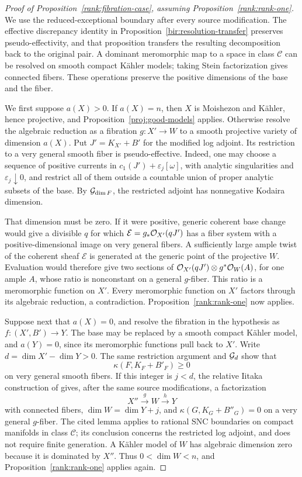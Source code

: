 \begin{proof}[Proof of Proposition~\ref{rank:fibration-case},
assuming Proposition~\ref{rank:rank-one}]
We use the reduced-exceptional boundary after every source modification.
The effective discrepancy identity in
Proposition~\ref{bir:resolution-transfer} preserves pseudo-effectivity,
and that proposition transfers the resulting decomposition back to the
original pair.  A dominant meromorphic map to
a space in class \(\mathcal C\) can be resolved on smooth compact Kähler
models; taking Stein factorization gives connected fibers.  These
operations preserve the positive dimensions of the base and the fiber.

We first suppose \(a(X)>0\).  If \(a(X)=n\), then \(X\) is Moishezon and
Kähler, hence projective, and Proposition~\ref{proj:good-models} applies.
Otherwise resolve the algebraic reduction as a fibration
\(g:X'\to W\) to a smooth projective variety of dimension \(a(X)\).
Put \(J'=K_{X'}+B'\) for the modified log adjoint.  Its restriction to
a very general smooth fiber is pseudo-effective.  Indeed, one may choose
a sequence of positive currents in
\(c_1(J')+\varepsilon_j[\omega]\), with analytic singularities and
\(\varepsilon_j\downarrow0\), and restrict all of them outside a
countable union of proper analytic subsets of the base.  By
\(\mathcal G_{\dim F}\), the restricted adjoint has nonnegative Kodaira
dimension.

That dimension must be zero.  If it were positive, generic coherent
base change would give a divisible \(q\) for which
\(\mathcal E=g_*\mathcal O_{X'}(qJ')\) has a fiber system with a
positive-dimensional image on very general fibers.  A sufficiently
large ample twist of the coherent sheaf \(\mathcal E\) is generated at
the generic point of the projective \(W\).  Evaluation would therefore
give two sections of
\(\mathcal O_{X'}(qJ')\otimes g^*\mathcal O_W(A)\), for one ample \(A\), whose ratio
is nonconstant on a general \(g\)-fiber.  This ratio is a meromorphic
function on \(X'\).  Every meromorphic function on \(X'\) factors
through its algebraic reduction, a contradiction.
Proposition~\ref{rank:rank-one} now applies.

Suppose next that \(a(X)=0\), and resolve the fibration in the
hypothesis as \(f:(X',B')\to Y\).  The base may be replaced by a smooth
compact Kähler model, and \(a(Y)=0\), since its meromorphic functions
pull back to \(X'\).  Write \(d=\dim X'-\dim Y>0\).
The same restriction argument and \(\mathcal G_d\) show that
\[
       \kappa(F,K_F+B'_F)\geq0
\]
on very general smooth fibers.  If this integer is \(j<d\), the relative
Iitaka construction of \cite[Lemma~2.6]{CI} gives, after the same
source modifications, a factorization
\[
             X''\xrightarrow{g}W\xrightarrow{h}Y
\]
with connected fibers, \(\dim W=\dim Y+j\), and
\(\kappa(G,K_G+B''_G)=0\) on a very general \(g\)-fiber.  The cited
lemma applies to rational SNC boundaries on compact manifolds in
class \(\mathcal C\); its conclusion concerns the restricted log
adjoint, and does not require finite generation.  A Kähler model of
\(W\) has algebraic dimension zero because it is dominated by \(X''\).
Thus \(0<\dim W<n\), and Proposition~\ref{rank:rank-one} applies again.


\end{proof}
